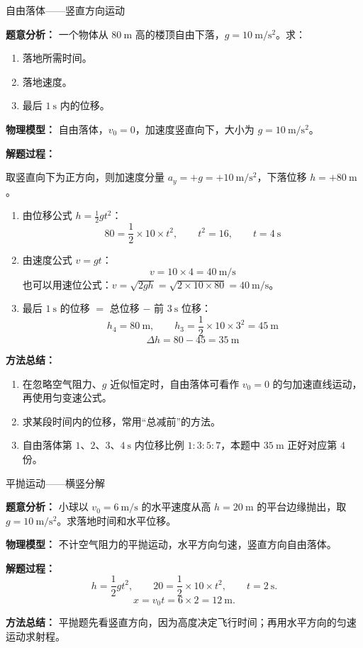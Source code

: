 \begin{examplebox}{自由落体——竖直方向运动}

\textbf{题意分析：} 一个物体从 $80\ \mathrm{m}$ 高的楼顶自由下落，$g = 10\ \mathrm{m/s^2}$。求：
\begin{enumerate}
  \item 落地所需时间。
  \item 落地速度。
  \item 最后 $1\ \mathrm{s}$ 内的位移。
\end{enumerate}

\textbf{物理模型：} 自由落体，$v_0=0$，加速度竖直向下，大小为 $g=10\ \mathrm{m/s^2}$。

\textbf{解题过程：}

取竖直向下为正方向，则加速度分量 $a_y=+g=+10\ \mathrm{m/s^2}$，下落位移 $h=+80\ \mathrm{m}$。

\begin{enumerate}
  \item 由位移公式 $h = \frac12 g t^2$：
  \[
  80 = \frac12 \times 10 \times t^2,\qquad t^2 = 16,\qquad t = 4\ \mathrm{s}
  \]

  \item 由速度公式 $v = gt$：
  \[
  v = 10 \times 4 = 40\ \mathrm{m/s}
  \]
  也可以用速位公式：$v = \sqrt{2gh} = \sqrt{2 \times 10 \times 80} = 40\ \mathrm{m/s}$。

  \item 最后 $1\ \mathrm{s}$ 的位移 $=$ 总位移 $-$ 前 $3\ \mathrm{s}$ 位移：
  \[
  h_4 = 80\ \mathrm{m},\qquad h_3 = \frac12 \times 10 \times 3^2 = 45\ \mathrm{m}
  \]
  \[
  \Delta h = 80 - 45 = 35\ \mathrm{m}
  \]
\end{enumerate}

\textbf{方法总结：}
\begin{enumerate}
  \item 在忽略空气阻力、$g$ 近似恒定时，自由落体可看作 $v_0=0$ 的匀加速直线运动，再使用匀变速公式。
  \item 求某段时间内的位移，常用“总减前”的方法。
  \item 自由落体第 $1$、$2$、$3$、$4\ \mathrm{s}$ 内位移比例 $1:3:5:7$，本题中 $35\ \mathrm{m}$ 正好对应第 $4$ 份。
\end{enumerate}

\end{examplebox}

\begin{examplebox}{平抛运动——横竖分解}

\textbf{题意分析：} 小球以 $v_0=6\ \mathrm{m/s}$ 的水平速度从高 $h=20\ \mathrm{m}$ 的平台边缘抛出，取 $g=10\ \mathrm{m/s^2}$。求落地时间和水平位移。

\textbf{物理模型：} 不计空气阻力的平抛运动，水平方向匀速，竖直方向自由落体。

\textbf{解题过程：}
\[
h=\frac12gt^2,\qquad 20=\frac12\times10\times t^2,\qquad t=2\ \mathrm{s}.
\]
\[
x=v_0t=6\times2=12\ \mathrm{m}.
\]

\textbf{方法总结：} 平抛题先看竖直方向，因为高度决定飞行时间；再用水平方向的匀速运动求射程。
\end{examplebox}

